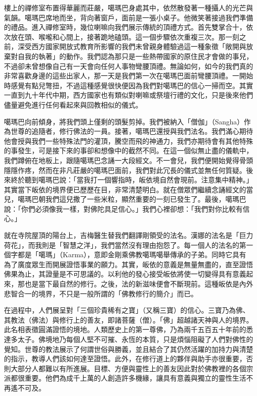 樓上的禪修室布置得華麗而莊嚴，噶瑪巴身處其中，依然散發著一種攝人的光芒與氣韻。噶瑪巴席地而坐，背向著窗戶，面前是一張小桌子。他微笑著接過我們準備的禮品。進入禪修室時，幾位喇嘛向我們展示傳統的頂禮方式。首先雙掌合十，依次放在頭、喉嚨和心間上，接著跪地磕頭。這一個步驟依次重複三次。那一刻之前，深受西方國家開放式教育所影響的我們未曾親身體驗過這一種象徵「敞開與放棄對自我的執著」的動作。我們認為那只是一些熱帶國家的原住民才會做的事兒，不過卻未曾想像自己有一天會向任何人事物彎腰頂禮。無論如何，如今的我們真的非常喜歡身邊的這些出家人，那一天是我們第一次在噶瑪巴面前彎腰頂禮。一開始時感覺有點兒彆扭，不過這種感覺很快便因為我們對噶瑪巴的信心一掃而空。其實一直到九十年代中期，西方國家也有類似對喇嘛或祭壇行禮的文化，只是後來他們儘量避免進行任何看起來與回教相似的儀式。

噶瑪巴向前傾身，將我們頭上僅剩的頭髮剪掉。我們被納入「僧伽」（Sangha）作為世尊的追隨者，修行佛法的一員。接著，噶瑪巴還授與我們法名。我們滿心期待他會授與我們一些特殊法門的灌頂，騰空而飛的神通力，我們亦期待會有其他特殊的事發生，可是接下來的事卻和想像中的截然不同。在這一個似無止盡的儀軌中，我們蹲俯在地板上，跟隨噶瑪巴念誦一大段經文。不一會兒，我們便開始覺得骨頭隱隱作疼，然而在非凡莊嚴的噶瑪巴面前，我們對此冗長的儀式並無任何質疑。後來終於聽到噶瑪巴說：「當我打一個響指時，皈依境自然會現前。注意集中精神。」其實當下皈依的境界便已歷歷在目，非常清楚明白。就在僧眾們繼續念誦經文的當兒，噶瑪巴朝我們這兒撒了一些米粒，顯然重要的一刻已發生了。最後，噶瑪巴說：「你們必須像我一樣，對佛陀具足信心。」我們心裡卻想：「我們對你比較有信心。」

就在寺院屋頂的陽台上，吉梅醫生替我們翻譯剛領受的法名。漢娜的法名是「巨力荷花」，而我則是「智慧之洋」，我們當然沒有理由抱怨了。每一個人的法名的第一個字都是「噶瑪」（Karma），意即金剛乘佛教噶瑪噶舉傳承的子弟。同時它具有為了廣度眾生而開展證悟事業的願力。其實，皈依的意義是無量無盡的，直至證悟佛果為止，其證量是不可思議的。以利他的發心接受皈依將使一切變得具有意義起來，那也是當下最自然的修行。之後，法的新滋味便會不斷現前。這種皈依是內外悲智合一的境界，不只是一般所謂的「佛教修行的簡介」而已。

在過程中，人們展呈對「三個珍貴稀有之寶」（又稱三寶）的信心。三寶乃為佛、其教法（佛法）與修行上的善友，即諸菩薩（僧）。「佛」超越諸天神與人的境界。此名相表徵圓滿證悟的境地。人類歷史上的第一尊佛，乃為兩千五百五十年前的悉達多太子。佛境地乃每個人堅不可摧、永恆的本質，只是煩惱阻礙了人們對佛性的覺知。世尊的教法展示了何謂世俗與勝義，並且結合了其仍然活躍的加持力與清楚的指示，教導人們該如何達至證悟。此外，在修行道上的夥伴與助手亦很重要，否則大部分人都難以有所進展。目標、方便與靈性上的善友因此對於佛教裡的各個宗派都很重要。他們為成千上萬的人創造許多機緣，讓具有意義與獨立的靈性生活不再遙不可及。

